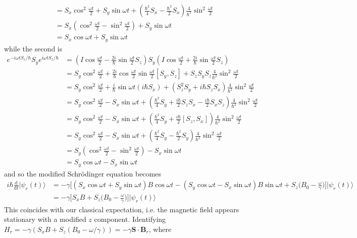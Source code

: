 \documentclass[../principles-of-quantum-mechanics.tex]{subfiles}
\begin{document}
\begin{questions}
\begin{solution}
\begin{align*}
				&= S_x\cos^2\tfrac{\omega t}{2} + S_y\sin\omega t + (\tfrac{\hbar^2}{4}S_x - \tfrac{\hbar^2}{2}S_x)\tfrac{4}{\hbar^2}\sin^2\tfrac{\omega t}{2} \\
				&= S_x(\cos^2\tfrac{\omega t}{2} - \sin^2\tfrac{\omega t}{2}) + S_y\sin\omega t \\
				&= S_x\cos\omega t + S_y\sin\omega t
			\end{align*}
			while the second is
			\begin{align*}
				e^{-i\omega tS_z/\hbar}S_ye^{i\omega tS_z/\hbar} &= (I\cos\tfrac{\omega t}{2} - \tfrac{2i}{\hbar}\sin\tfrac{\omega t}{2}S_z)S_y(I\cos\tfrac{\omega t}{2} + \tfrac{2i}{\hbar}\sin\tfrac{\omega t}{2}S_z) \\
				&= S_y\cos^2\tfrac{\omega t}{2} + \tfrac{2i}{\hbar}\cos\tfrac{\omega t}{2}\sin\tfrac{\omega t}{2}[S_y, S_z] +  S_zS_yS_z\tfrac{4}{\hbar^2}\sin^2\tfrac{\omega t}{2} \\
				&= S_y\cos^2\tfrac{\omega t}{2} + \frac{i}{\hbar}\sin\omega t(i\hbar S_x) + (S_z^2S_y + i\hbar S_zS_x)\tfrac{4}{\hbar^2}\sin^2\tfrac{\omega t}{2} \\
				&= S_y\cos^2\tfrac{\omega t}{2} - S_x\sin\omega t + (\tfrac{\hbar^2}{4}S_y + \tfrac{i\hbar}{2}S_zS_x - \tfrac{i\hbar}{2}S_xS_z)\tfrac{4}{\hbar^2}\sin^2\tfrac{\omega t}{2} \\
				&= S_y\cos^2\tfrac{\omega t}{2} - S_x\sin\omega t + (\tfrac{\hbar^2}{4}S_y + \tfrac{i\hbar}{2}[S_z, S_x])\tfrac{4}{\hbar^2}\sin^2\tfrac{\omega t}{2} \\
				&= S_y\cos^2\tfrac{\omega t}{2} - S_x\sin\omega t + (\tfrac{\hbar^2}{4}S_y - \tfrac{\hbar^2}{2}S_y)\tfrac{4}{\hbar^2}\sin^2\tfrac{\omega t}{2} \\
				&= S_y(\cos^2\tfrac{\omega t}{2} - \sin^2\tfrac{\omega t}{2}) - S_x\sin\omega t \\
				&= S_y\cos\omega t - S_x\sin\omega t
			\end{align*}
			and so the modified Schr\"odinger equation becomes
			\begin{align*}
				i\hbar\frac{\mathrm{d}}{\mathrm{d}t}|\psi_r(t)\rangle &= -\gamma \Big[(S_x\cos\omega t + S_y\sin\omega t)B\cos\omega t - (S_y\cos\omega t - S_x\sin\omega t)B\sin\omega t + S_z\Big(B_0 - \frac{\omega}{\gamma}\Big)\Big]|\psi_r(t)\rangle \\
				&= -\gamma \Big[S_xB + S_z\Big(B_0 - \frac{\omega}{\gamma}\Big)\Big]|\psi_r(t)\rangle
			\end{align*}
			This coincides with our classical expectation, i.e. the magnetic field appears stationary with a modified $z$ component. Identifying $H_r = -\gamma(S_xB + S_z(B_0 - \omega/\gamma)) = -\gamma\mathbf{S}\cdot\mathbf{B}_r$, where

\end{solution}
\end{questions}
\end{document}
